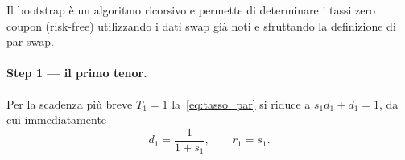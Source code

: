 \documentclass[11pt,a4paper]{article}
\theoremstyle{plain}
\theoremstyle{definition}
\theoremstyle{remark}
\newcommand{\FSP}{\mathrm{FSP}}
\newcommand{\defeq}{\coloneqq}
\begin{document}

Il bootstrap è un algoritmo ricorsivo e permette di determinare i tassi zero coupon (risk-free)
utilizzando i dati swap gi\`a noti e sfruttando la definizione di par swap. %
\paragraph{Step 1 --- il primo tenor.}
Per la scadenza pi\`u breve $T_1=1$ la~\eqref{eq:tasso_par} si riduce a $s_1 d_1+d_1=1$, da
cui immediatamente
\begin{equation}
  \label{eq:step1}
  d_1 = \frac{1}{1+s_1}, \qquad r_1 = s_1.
\end{equation}
\end{document}
